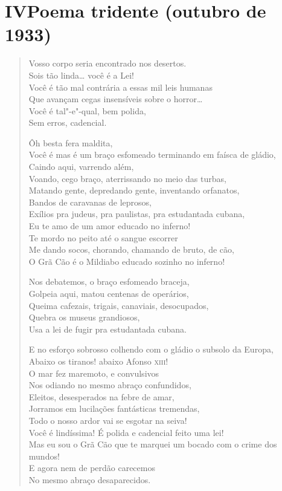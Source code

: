 \section*{IV\break Poema tridente \break (outubro de 1933)}

\begin{verse}
Vosso corpo seria encontrado nos desertos.\\
Sois tão linda\ldots{} você é a Lei!\\
Você é tão mal contrária a essas mil leis humanas\\
Que avançam cegas insensíveis sobre o horror\ldots{}\\
Você é tal"-e"-qual, bem polida,\\
Sem erros, cadencial.

Ôh besta fera maldita,\\
Você é mas é um braço esfomeado terminando em faísca de gládio,\\
Caindo aqui, varrendo além,\\
Voando, cego braço, aterrissando no meio das turbas,\\
Matando gente, depredando gente, inventando orfanatos,\\
Bandos de caravanas de leprosos,\\
Exílios pra judeus, pra paulistas, pra estudantada cubana,\\
Eu te amo de um amor educado no inferno!\\
Te mordo no peito até o sangue escorrer\\
Me dando socos, chorando, chamando de bruto, de cão,\\
O Grã Cão é o Mildiabo educado sozinho no inferno!

Nos debatemos, o braço esfomeado braceja,\\
Golpeia aqui, matou centenas de operários,\\
Queima cafezais, trigais, canaviais, desocupados,\\
Quebra os museus grandiosos,\\
Usa a lei de fugir pra estudantada cubana.

E no esforço sobrosso colhendo com o gládio o subsolo da Europa,\\
Abaixo os tiranos! abaixo Afonso \textsc{xiii}!\\
O mar fez maremoto, e convulsivos\\
Nos odiando no mesmo abraço confundidos,\\
Eleitos, desesperados na febre de amar,\\
Jorramos em lucilações fantásticas tremendas,\\
Todo o nosso ardor vai se esgotar na seiva!\\
Você é lindíssima! É polida e cadencial feito uma lei!\\
Mas eu sou o Grã Cão que te marquei um bocado com o crime dos mundos!\\
E agora nem de perdão carecemos\\
No mesmo abraço desaparecidos.
\end{verse}

